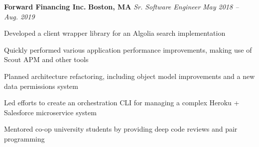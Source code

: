 \item
\headerrow
{\textbf{Forward Financing Inc.}}
{\textbf{Boston, MA}}
\headerrow
{\emph{Sr. Software Engineer}}
{\emph{May 2018 -- Aug. 2019}}
\begin{itemize*}
    \item Developed a client wrapper library for an Algolia search
        implementation
    \item Quickly performed various application performance improvements, making
        use of Scout APM and other tools
    \item Planned architecture refactoring, including object model
        improvements and a new data permissions system
    \item Led efforts to create an orchestration CLI for managing a complex
        Heroku + Salesforce microservice system
    \item Mentored co-op university students by providing deep code reviews
        and pair programming
\end{itemize*}
